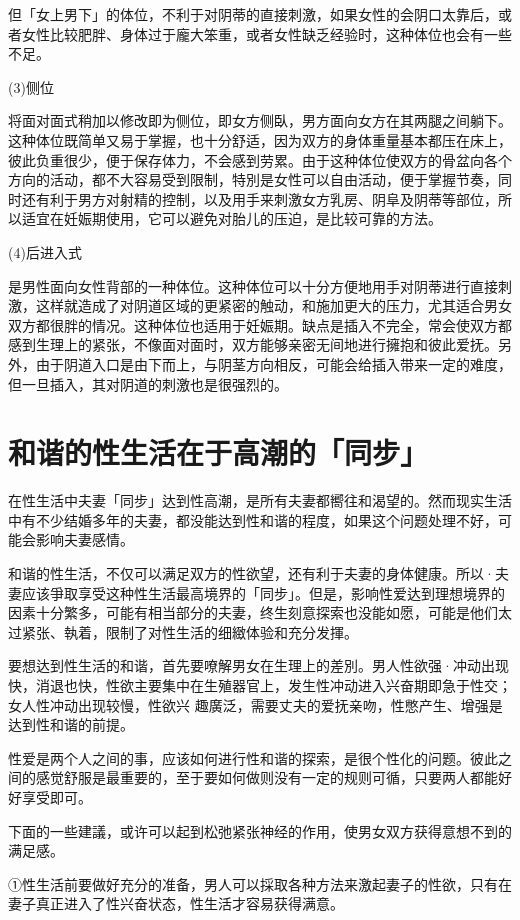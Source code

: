 \documentclass[12pt,UTF8]{ctexbook}
\begin{document}
但「女上男下」的体位，不利于对阴蒂的直接刺激，如果女性的会阴口太靠后，或者女性比较肥胖、身体过于龐大笨重，或者女性缺乏经验时，这种体位也会有一些不足。

(3)侧位

将面对面式稍加以修改即为侧位，即女方侧臥，男方面向女方在其两腿之间躺下。这种体位既简单又易于掌握，也十分舒适，因为双方的身体重量基本都压在床上，彼此负重很少，便于保存体力，不会感到劳累。由于这种体位使双方的骨盆向各个方向的活动，都不大容易受到限制，特別是女性可以自由活动，便于掌握节奏，同时还有利于男方对射精的控制，以及用手来刺激女方乳房、阴阜及阴蒂等部位，所以适宜在妊娠期使用，它可以避免对胎儿的压迫，是比较可靠的方法。

(4)后进入式

是男性面向女性背部的一种体位。这种体位可以十分方便地用手对阴蒂进行直接刺激，这样就造成了对阴道区域的更紧密的触动，和施加更大的压力，尤其适合男女双方都很胖的情况。这种体位也适用于妊娠期。缺点是插入不完全，常会使双方都感到生理上的紧张，不像面对面时，双方能够亲密无间地进行擁抱和彼此爱抚。另外，由于阴道入口是由下而上，与阴茎方向相反，可能会给插入带来一定的难度，但一旦插入，其对阴道的刺激也是很强烈的。

\section{和谐的性生活在于高潮的「同步」}

在性生活中夫妻「同步」达到性高潮，是所有夫妻都嚮往和渴望的。然而现实生活中有不少结婚多年的夫妻，都没能达到性和谐的程度，如果这个问题处理不好，可能会影响夫妻感情。

和谐的性生活，不仅可以满足双方的性欲望，还有利于夫妻的身体健康。所以·夫妻应该爭取享受这种性生活最高境界的「同步」。但是，影响性爱达到理想境界的因素十分繁多，可能有相当部分的夫妻，终生刻意探索也没能如愿，可能是他们太过紧张、執着，限制了对性生活的细緻体验和充分发揮。

要想达到性生活的和谐，首先要嘹解男女在生理上的差別。男人性欲强·冲动出现快，消退也快，性欲主要集中在生殖器官上，发生性冲动进入兴奋期即急于性交；女人性冲动出现较慢，性欲兴
趣廣泛，需要丈夫的爱抚亲吻，性憋产生、增强是达到性和谐的前提。

性爱是两个人之间的事，应该如何进行性和谐的探索，是很个性化的问题。彼此之间的感觉舒服是最重要的，至于要如何做则没有一定的规则可循，只要两人都能好好享受即可。

下面的一些建議，或许可以起到松弛紧张神经的作用，使男女双方获得意想不到的满足感。

①性生活前要做好充分的准备，男人可以採取各种方法来激起妻子的性欲，只有在妻子真正进入了性兴奋状态，性生活才容易获得满意。
\end{document}
